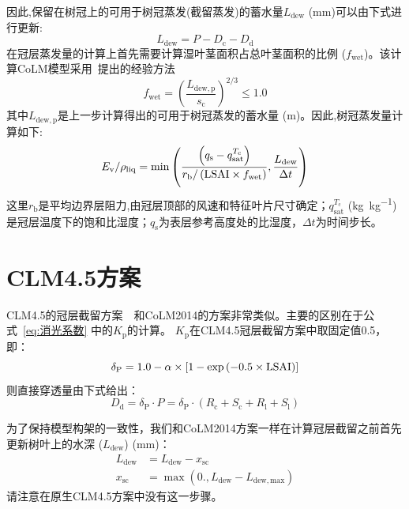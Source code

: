 因此,保留在树冠上的可用于树冠蒸发(截留蒸发)的蓄水量$L_{\mathrm{dew}}$ (mm)可以由下式进行更新:
\begin{equation}
  L_{\mathrm{dew}}={P}-D_{\mathrm{c}}-D_{\mathrm{d}}
\end{equation}
在冠层蒸发量的计算上首先需要计算湿叶茎面积占总叶茎面积的比例 ($f_{\mathrm{wet}}$)。该计算CoLM模型采用~\citet{dickinson1993biosphere}提出的经验方法
\begin{equation}
  f_{\mathrm{{wet}}}=\left(\frac{L_{\mathrm{dew, p}}}{s_{\mathrm{c}}}\right)^{2 / 3} \leqslant 1.0
\end{equation}
其中$L_{\mathrm{dew, p}}$是上一步计算得出的可用于树冠蒸发的蓄水量 (m)。因此,树冠蒸发量计算如下:
\begin{equation}
  E_{\mathrm{v}} / \rho_{\mathrm{liq}}=\min \left(\frac{\left(q_{\mathrm{s}}-q_{\mathrm{sat}}^{T_{\mathrm{c}}}\right)}{r_{\mathrm{b}} /\left({\rm LSAI} \times f_{\mathrm{wet}}\right)}, \frac{L_{\mathrm{dew}}}{\Delta t}\right)
\end{equation}
这里$r_{\mathrm {b}} $是平均边界层阻力,由冠层顶部的风速和特征叶片尺寸确定；$q_{\mathrm{sat}}^{T_{\mathrm {c}} }$ (\unit{kg.kg^{-1}})是冠层温度下的饱和比湿度；$q_{\mathrm {s}} $为表层参考高度处的比湿度，$\Delta t$为时间步长。


\section{CLM4.5方案}
CLM4.5的冠层截留方案~\citep{oleson2013technical}~和CoLM2014的方案非常类似。主要的区别在于公式~\eqref{eq:消光系数} 中的$K_{\mathrm {p}} $的计算。
$K_{\mathrm {p}} $在CLM4.5冠层截留方案中取固定值0.5，即：
%
\begin{equation}
  \delta_{\mathrm{P}}=1.0-\alpha \times\left[1-\exp \left(-0.5 \times {\rm LSAI}\right)\right]
\end{equation}
则直接穿透量由下式给出：
\begin{equation}
  D_{\mathrm{d}}=\delta_{\mathrm{P}} \cdot P=\delta_{\mathrm{P}} \cdot\left(R_{\mathrm{c}}+S_{\mathrm{c}}+R_{\mathrm{l}}+S_{\mathrm{l}}\right)
\end{equation}

为了保持模型构架的一致性，我们和CoLM2014方案一样在计算冠层截留之前首先更新树叶上的水深 ($L_{\mathrm{dew}}$) (mm)：
\begin{equation}
  \begin{aligned}
    L_{\mathrm{dew}} &= L_{\mathrm{dew}}-x_{\mathrm{sc}} \\
    x_{\mathrm{s c}} &= \max \left(0., L_{\mathrm{dew}}-L_{\mathrm{dew,max}}\right)
  \end{aligned}
\end{equation}
请注意在原生CLM4.5方案中没有这一步骤。

